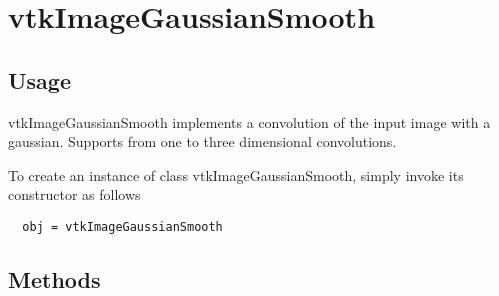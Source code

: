\section{vtkImageGaussianSmooth}

\subsection{Usage}

 vtkImageGaussianSmooth implements a convolution of the input image
 with a gaussian. Supports from one to three dimensional convolutions.

To create an instance of class vtkImageGaussianSmooth, simply
invoke its constructor as follows
\begin{verbatim}
  obj = vtkImageGaussianSmooth
\end{verbatim}
\subsection{Methods}

